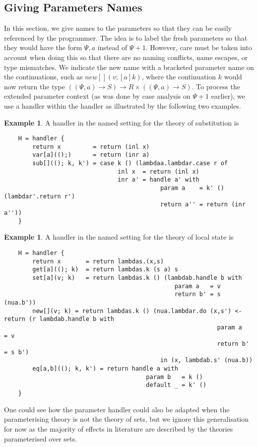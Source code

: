 \documentclass{scrartcl}
\theoremstyle{definition}
\newtheorem{example}[theorem]{Example}
\newcommand{\PCtx}{\Psi}
\begin{document}
\subsection{Giving Parameters Names}

In this section, we give names to the parameters so that they can be easily referenced by the programmer. The idea is to label the fresh parameters so that they would have the form $\PCtx,a$ instead of $\PCtx+1$. However, care must be taken into account when doing this so that there are no naming conflicts, name escapes, or type mismatches. We indicate the new name with a bracketed parameter name on the continuations, such as $new[](v; [a]k)$, where the continuation $k$ would now return the type $((\PCtx,a)\to S)\to R\times ((\PCtx,a)\to S)$. To process the extended parameter context (as was done by case analysis on $\PCtx+1$ earlier), we use a handler within the handler as illustrated by the following two examples.

\begin{example}
A handler in the named setting for the theory of substitution is
\begin{lstlisting}
    H = handler {
        return x         = return (inl x)
        var[a](();)      = return (inr a)
        sub[]((); k, k') = case k () (lambdaa.lambdar.case r of
                                inl x  = return (inl x)
                                inr a' = handle a' with
                                            param a    = k' () (lambdar'.return r')
                                            return a'' = return (inr a''))
    }
\end{lstlisting}
\end{example}

\begin{example} \label{ex:named_sub}
A handler in the named setting for the theory of local state is
\begin{lstlisting}
    H = handler {
        return x       = return lambdas.(x,s)
        get[a]((); k)  = return lambdas.k (s a) s
        set[a](v; k)   = return lambdas.k () (lambdab.handle b with
                                                param a   = v
                                                return b' = s (nua.b'))
        new[](v; k) = return lambdas.k () (nua.lambdar.do (x,s') <- return (r lambdab.handle b with
                                                            param a   = v
                                                            return b' = s b')
                                            in (x, lambdab.s' (nua.b))
        eq[a,b]((); k, k') = return handle a with
                                        param b   = k ()
                                        default _ = k' ()
    }
\end{lstlisting}
\end{example}
One could see how the parameter handler could also be adapted when the parameterising theory is not the theory of sets, but we ignore this generalisation for now as the majority of effects in literature are described by the theories parameterised over sets.
\end{document}
